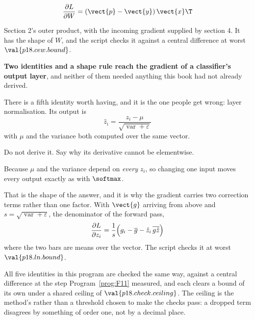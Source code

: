 \begin{fr}
\begin{ansblock}
\[ \frac{\partial L}{\partial W} = (\vect{p} - \vect{y})\,\vect{x}\T \]
\end{ansblock}

Section 2's outer product, with the incoming gradient supplied by section 4.
It has the shape of $W$, and the script checks it against a central
difference at worst $\val{p18.cew.bound}$.

\textbf{Two identities and a shape rule reach the gradient of a classifier's
output layer}, and neither of them needed anything this book had not already
derived.
\end{fr}

\begin{fr}
There is a fifth identity worth having, and it is the one people get wrong:
layer normalisation. Its output is
\[ \hat{z}_i = \frac{z_i - \mu}{\sqrt{\operatorname{var} + \varepsilon}} \]
with $\mu$ and the variance both computed over the same vector.

Do not derive it. Say why its derivative cannot be elementwise.
\dotline
\nextframe
\end{fr}

\begin{fr}
\begin{ansblock}
Because $\mu$ and the variance depend on \emph{every} $z_i$, so changing one
input moves every output \dash{} exactly as with $\softmax$.
\end{ansblock}

That is the shape of the answer, and it is why the gradient carries two
correction terms rather than one factor. With $\vect{g}$ arriving from above
and $s = \sqrt{\operatorname{var} + \varepsilon}$, the denominator of the
forward pass,
\[ \frac{\partial L}{\partial z_i} = \frac{1}{s}\Bigl(g_i
   - \overline{g} - \hat{z}_i\,\overline{g\hat{z}}\Bigr) \]
where the two bars are means over the vector. The script checks it at
worst $\val{p18.ln.bound}$.

\begin{note}
All five identities in this program are checked the same way, against a
central difference at the step Program~\ref{prog:F11} measured, and each
clears a bound of its own under a shared ceiling of
$\val{p18.check.ceiling}$. The ceiling is the method's rather than a
threshold chosen to make the checks pass: a dropped term disagrees by
something of order one, not by a decimal place.
\end{note}
\end{fr}

